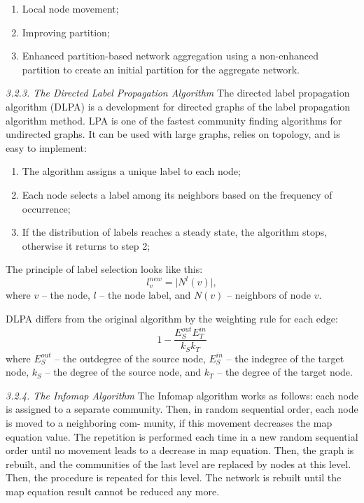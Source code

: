 \begin{enumerate}
	\item Local node movement;
	\item Improving partition;
	\item Enhanced partition-based network aggregation using a non-enhanced partition to
	create an initial partition for the aggregate network.
\end{enumerate}

\textit{3.2.3. The Directed Label Propagation Algorithm} The directed label propagation algorithm (DLPA) \cite{Li} is a development for directed graphs of the label propagation algorithm \cite{RaghavanAlbertKumara} method. LPA is one of the fastest community finding algorithms for undirected graphs. It can be used with large graphs, relies on topology, and is easy to implement:

\begin{enumerate}
	\item The algorithm assigns a unique label to each node;
	\item Each node selects a label among its neighbors based on the frequency of occurrence; 
	\item If the distribution of labels reaches a steady state, the algorithm stops, otherwise it returns to step 2;
\end{enumerate}

The principle of label selection looks like this:
\[
	l^{new}_v = \lvert N^l(v) \rvert,
\]
where \(v\) -- the node, \(l\) -- the node label, and \(N(v)\) -- neighbors of node \(v\).

DLPA differs from the original algorithm by the weighting rule for each edge:
\[
1 - \frac{E^{out}_S E^{in}_T}{k_S k_T}
\]
where \(E^{out}_S\) -- the outdegree of the source node, \(E^{in}_S\) -- the indegree of the target node, \(k_S\) -- the degree of the source node, and \(k_T\) -- the degree of the target node.

\textit{3.2.4. The Infomap Algorithm} The Infomap \cite{RosvallAxelssonBergstrom} algorithm works as follows: each node is assigned to a separate community. Then, in random sequential order, each node is moved to a neighboring com- munity, if this movement decreases the map equation value. The repetition is performed each time in a new random sequential order until no movement leads to a decrease in map equation. Then, the graph is rebuilt, and the communities of the last level are replaced by nodes at this level. Then, the procedure is repeated for this level. The network is rebuilt until the map equation result cannot be reduced any more.

